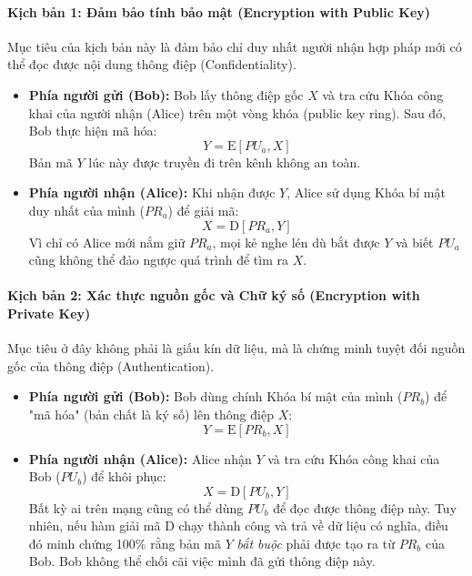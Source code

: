 \paragraph*{Kịch bản 1: Đảm bảo tính bảo mật (Encryption with Public Key)}
Mục tiêu của kịch bản này là đảm bảo chỉ duy nhất người nhận hợp pháp mới có thể đọc được nội dung thông điệp (Confidentiality).
\begin{itemize}
    \item \textbf{Phía người gửi (Bob):} Bob lấy thông điệp gốc $X$ và tra cứu Khóa công khai của người nhận (Alice) trên một vòng khóa (public key ring). Sau đó, Bob thực hiện mã hóa: 
    $$Y = \mathrm{E}[PU_a, X]$$
    Bản mã $Y$ lúc này được truyền đi trên kênh không an toàn.
    \item \textbf{Phía người nhận (Alice):} Khi nhận được $Y$, Alice sử dụng Khóa bí mật duy nhất của mình ($PR_a$) để giải mã: 
    $$X = \mathrm{D}[PR_a, Y]$$
    Vì chỉ có Alice mới nắm giữ $PR_a$, mọi kẻ nghe lén dù bắt được $Y$ và biết $PU_a$ cũng không thể đảo ngược quá trình để tìm ra $X$.
\end{itemize}

\paragraph*{Kịch bản 2: Xác thực nguồn gốc và Chữ ký số (Encryption with Private Key)}
Mục tiêu ở đây không phải là giấu kín dữ liệu, mà là chứng minh tuyệt đối nguồn gốc của thông điệp (Authentication).
\begin{itemize}
    \item \textbf{Phía người gửi (Bob):} Bob dùng chính Khóa bí mật của mình ($PR_b$) để "mã hóa" (bản chất là ký số) lên thông điệp $X$: 
    $$Y = \mathrm{E}[PR_b, X]$$
    \item \textbf{Phía người nhận (Alice):} Alice nhận $Y$ và tra cứu Khóa công khai của Bob ($PU_b$) để khôi phục:
    $$X = \mathrm{D}[PU_b, Y]$$
    Bất kỳ ai trên mạng cũng có thể dùng $PU_b$ để đọc được thông điệp này. Tuy nhiên, nếu hàm giải mã $\mathrm{D}$ chạy thành công và trả về dữ liệu có nghĩa, điều đó minh chứng 100\% rằng bản mã $Y$ \textit{bắt buộc} phải được tạo ra từ $PR_b$ của Bob. Bob không thể chối cãi việc mình đã gửi thông điệp này.
\end{itemize}

